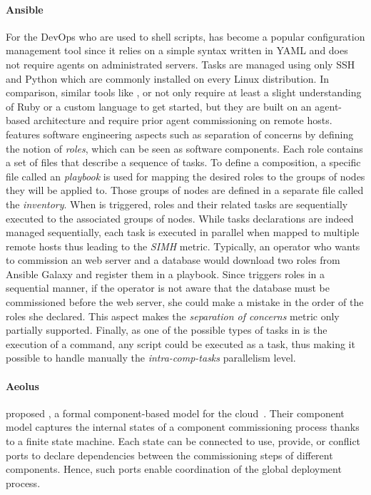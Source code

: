 \paragraph{Ansible}
For the DevOps who are used to shell scripts, \ansible has become a popular configuration management tool since it relies on a simple syntax written in YAML and does not require agents on administrated servers. Tasks are managed using only SSH and Python which are commonly installed on every Linux distribution. In comparison, similar tools like \chef, \puppet or \cfengine not only require at least a slight understanding of Ruby or a custom language to get started, but they are built on an agent-based architecture and require prior agent commissioning on remote hosts. \ansible features software engineering aspects such as separation of concerns by defining the notion of \emph{roles}, which can be seen as software components. Each role contains a set of files that describe a sequence of tasks. To define a composition, a specific file called an \ansible \emph{playbook} is used for mapping the desired roles to the groups of nodes they will be applied to. Those groups of nodes are defined in a separate file called the \emph{inventory}. When \ansible is triggered, roles and their related tasks are sequentially executed to the associated groups of nodes. While tasks declarations are indeed managed sequentially, each task is executed in parallel when mapped to multiple remote hosts thus leading to the \emph{SIMH} metric. Typically, an operator who wants to commission an \apache web server and a \mysql database would download two roles from Ansible Galaxy and register them in a playbook. Since \ansible triggers roles in a sequential manner, if the operator is not aware that the database must be commissioned before the web server, she could make a mistake in the order of the roles she declared. This aspect makes the \emph{separation of concerns} metric only partially supported. Finally, as one of the possible types of tasks in \ansible is the execution of a \shell command, any script could be executed as a task, thus making it possible to handle manually the \emph{intra-comp-tasks} parallelism level.


\paragraph{Aeolus}
\citeauthor{dicosmo2014ic} proposed \aeolus, a formal component-based model for the cloud~\cite{dicosmo2014ic}. Their component model captures the internal states of a component commissioning process thanks to a finite state machine. Each state can be connected to use, provide, or conflict ports to declare dependencies between the commissioning steps of different components. Hence, such ports enable coordination of the global deployment process.
%

